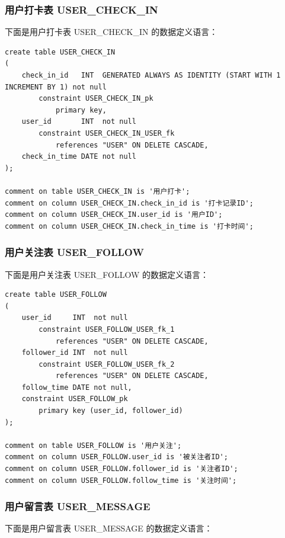 \subsubsection{用户打卡表 USER\_CHECK\_IN}

下面是用户打卡表 USER\_CHECK\_IN 的数据定义语言：

\begin{verbatim}
create table USER_CHECK_IN
(
    check_in_id   INT  GENERATED ALWAYS AS IDENTITY (START WITH 1 INCREMENT BY 1) not null
        constraint USER_CHECK_IN_pk
            primary key,
    user_id       INT  not null
        constraint USER_CHECK_IN_USER_fk
            references "USER" ON DELETE CASCADE,
    check_in_time DATE not null
);

comment on table USER_CHECK_IN is '用户打卡';
comment on column USER_CHECK_IN.check_in_id is '打卡记录ID';
comment on column USER_CHECK_IN.user_id is '用户ID';
comment on column USER_CHECK_IN.check_in_time is '打卡时间';
\end{verbatim}

\subsubsection{用户关注表 USER\_FOLLOW}

下面是用户关注表 USER\_FOLLOW 的数据定义语言：

\begin{verbatim}
create table USER_FOLLOW
(
    user_id     INT  not null
        constraint USER_FOLLOW_USER_fk_1
            references "USER" ON DELETE CASCADE,
    follower_id INT  not null
        constraint USER_FOLLOW_USER_fk_2
            references "USER" ON DELETE CASCADE,
    follow_time DATE not null,
    constraint USER_FOLLOW_pk
        primary key (user_id, follower_id)
);

comment on table USER_FOLLOW is '用户关注';
comment on column USER_FOLLOW.user_id is '被关注者ID';
comment on column USER_FOLLOW.follower_id is '关注者ID';
comment on column USER_FOLLOW.follow_time is '关注时间';
\end{verbatim}

\subsubsection{用户留言表 USER\_MESSAGE}

下面是用户留言表 USER\_MESSAGE 的数据定义语言：

